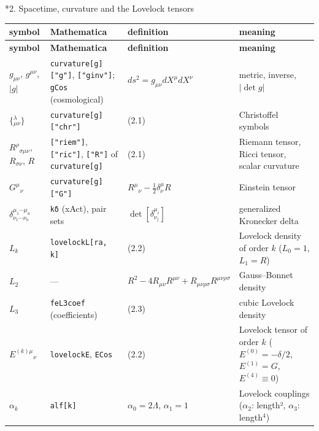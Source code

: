 \documentclass[10pt,a4paper]{article}
\makeatletter
\renewcommand\section{\@startsection{section}{1}{\z@}{-3.5ex \@plus -1ex \@minus -.2ex}{2.3ex \@plus.2ex}{\normalfont\Large\bfseries\raggedright}}
\makeatother
\begin{document}
\section*{2. Spacetime, curvature and the Lovelock tensors}
{\small
\begin{longtable}{>{\raggedright\arraybackslash}p{}>{\raggedright\arraybackslash}p{}>{\raggedright\arraybackslash}p{}>{\raggedright\arraybackslash}p{}}
\toprule
\textbf{symbol} & \textbf{Mathematica} & \textbf{definition} & \textbf{meaning} \\
\midrule\endfirsthead
\toprule
\textbf{symbol} & \textbf{Mathematica} & \textbf{definition} & \textbf{meaning} \\
\midrule\endhead
\endfoot
\bottomrule\endlastfoot
$g_{\mu\nu}$, $g^{\mu\nu}$, $|g|$ & \texttt{curvature[g]["g"]}, \texttt{["ginv"]}; \texttt{gCos} (cosmological) & $ds^2=g_{\mu\nu}dX^\mu dX^\nu$ & metric, inverse, $|\det g|$ \\
$\{{}^{\lambda}_{\mu\nu}\}$ & \texttt{curvature[g]["chr"]} & (2.1) & Christoffel symbols \\
$R^\rho{}_{\sigma\mu\nu}$, $R_{\sigma\nu}$, $R$ & \texttt{["riem"]}, \texttt{["ric"]}, \texttt{["R"]} of \texttt{curvature[g]} & (2.1) & Riemann tensor, Ricci tensor, scalar curvature \\
$G^\mu{}_\nu$ & \texttt{curvature[g]["G"]} & $R^\mu{}_\nu-\tfrac12\delta^\mu_\nu R$ & Einstein tensor \\
$\delta^{\mu_1\cdots\mu_n}_{\nu_1\cdots\nu_n}$ & \texttt{kδ} (xAct), pair sets & $\det[\delta^{\mu_i}_{\nu_j}]$ & generalized Kronecker delta \\
$L_k$ & \texttt{lovelockL[ra, k]} & (2.2) & Lovelock density of order $k$ ($L_0=1$, $L_1=R$) \\
$L_2$ & — & $R^2-4R_{\mu\nu}R^{\mu\nu}+R_{\mu\nu\rho\sigma}R^{\mu\nu\rho\sigma}$ & Gauss–Bonnet density \\
$L_3$ & \texttt{feL3coef} (coefficients) & (2.3) & cubic Lovelock density \\
$E^{(k)\mu}{}_\nu$ & \texttt{lovelockE}, \texttt{ECos} & (2.2) & Lovelock tensor of order $k$ ($E^{(0)}=-\delta/2$, $E^{(1)}=G$, $E^{(4)}\equiv0$) \\
$\alpha_k$ & \texttt{alf[k]} & $\alpha_0=2\Lambda$, $\alpha_1=1$ & Lovelock couplings ($\alpha_2$: length², $\alpha_3$: length\texorpdfstring{\ensuremath{{}^{4}}}{⁴}) \\

\end{longtable}}
\end{document}
